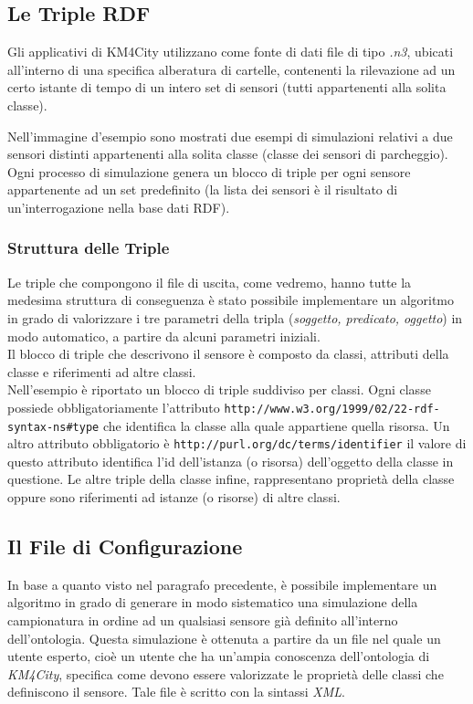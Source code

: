 \documentclass[12pt,a4paper,italian]{article}
\begin{document}
\subsection{Le Triple RDF}
Gli applicativi di KM4City utilizzano come fonte di dati file di tipo \emph{.n3}, ubicati all'interno di una specifica alberatura di cartelle, 
contenenti la rilevazione ad un certo istante di tempo di un intero set di sensori (tutti appartenenti alla solita classe).


Nell'immagine d'esempio sono mostrati due esempi di simulazioni relativi a due sensori distinti appartenenti alla solita classe (classe dei sensori di parcheggio). 
Ogni processo di simulazione genera un blocco di triple per ogni sensore appartenente ad un set predefinito (la lista dei sensori è il
risultato di un'interrogazione nella base dati RDF).
\subsubsection{Struttura delle Triple}
Le triple che compongono il file di uscita, come vedremo, hanno tutte la medesima struttura di conseguenza è stato possibile implementare un algoritmo in grado di valorizzare
i tre parametri della tripla (\emph{soggetto, predicato, oggetto}) in modo automatico, a partire da alcuni parametri iniziali.\\
Il blocco di triple che descrivono il sensore è composto da classi, attributi della classe e riferimenti ad altre classi.\\
Nell'esempio è riportato un blocco di triple suddiviso per classi. Ogni classe possiede obbligatoriamente l'attributo \texttt{http://www.w3.org/1999/02/22-rdf-syntax-ns\#type} che identifica la classe alla quale appartiene quella risorsa.
Un altro attributo obbligatorio è \texttt{http://purl.org/dc/terms/identifier} il valore di questo attributo identifica l'id dell'istanza (o risorsa) dell'oggetto della classe in questione.
Le altre triple della classe infine, rappresentano proprietà della classe oppure sono riferimenti ad istanze (o risorse) di altre classi.

\subsection{Il File di Configurazione}
In base a quanto visto nel paragrafo precedente, è possibile implementare un algoritmo in grado di generare in modo sistematico una simulazione della campionatura in ordine ad un qualsiasi  
sensore già definito all'interno dell'ontologia.
Questa simulazione è ottenuta a partire da un file nel quale un utente esperto, cioè un utente che ha un'ampia conoscenza dell'ontologia di \emph{KM4City}, specifica come devono essere valorizzate le proprietà 
delle classi che definiscono il sensore. Tale file è scritto con la sintassi \emph{XML}.
\end{document}
